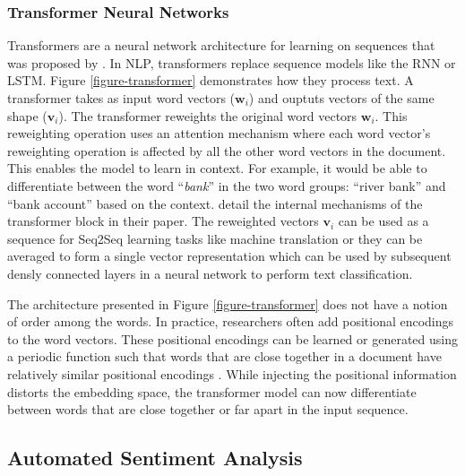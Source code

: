 \subsubsection{Transformer Neural Networks}
Transformers are a neural network architecture for learning on sequences that was proposed by . In NLP, transformers replace sequence models like the RNN or LSTM. Figure \ref{figure-transformer} demonstrates how they process text. A transformer takes as input word vectors ($\bm{w}_i$) and ouptuts vectors of the same shape ($\bm{v}_i$). The transformer reweights the original word vectors $\bm{w}_i$. This reweighting operation uses an attention mechanism where each word vector's reweighting operation is affected by all the other word vectors in the document. This enables the model to learn in context. For example, it would be able to differentiate between the word ``\emph{bank}'' in the two word groups: ``river bank'' and ``bank account'' based on the context.  detail the internal mechanisms of the transformer block in their paper. The reweighted vectors $\bm{v}_i$ can be used as a sequence for Seq2Seq learning tasks like machine translation or they can be averaged to form a single vector representation which can be used by subsequent densly connected layers in a neural network to perform text classification.




The architecture presented in Figure \ref{figure-transformer} does not have a notion of order among the words. In practice, researchers often add positional encodings to the word vectors. These positional encodings can be learned or generated using a periodic function such that words that are close together in a document have relatively similar positional encodings \cite{vaswani2017attention}. While injecting the positional information distorts the embedding space, the transformer model can now differentiate between words that are close together or far apart in the input sequence.


\subsection{Automated Sentiment Analysis}

